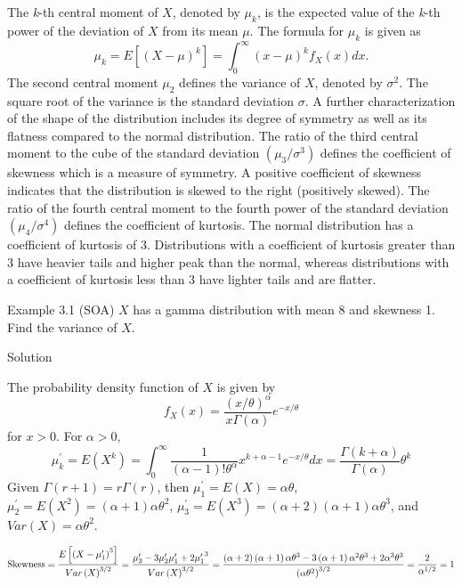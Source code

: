 \documentclass[]{book}
\theoremstyle{definition}
\theoremstyle{definition}
\theoremstyle{definition}
\theoremstyle{remark}
\begin{document}
The \emph{k}-th central moment of \(X\), denoted by \(\mu_{k}\), is the
expected value of the \emph{k}-th power of the deviation of \(X\) from
its mean \(\mu\). The formula for \(\mu_{k}\) is given as
\[\mu_{k} = E\left\lbrack {(X - \mu)}^{k} \right\rbrack = \int_{0}^{\infty}{\left( x - \mu \right)^{k}f_{X}\left( x \right) dx }.\]
The second central moment \(\mu_{2}\) defines the variance of \(X\),
denoted by \(\sigma^{2}\). The square root of the variance is the
standard deviation \(\sigma\). A further characterization of the shape
of the distribution includes its degree of symmetry as well as its
flatness compared to the normal distribution. The ratio of the third
central moment to the cube of the standard deviation
\(\left( \mu_{3} / \sigma^{3} \right)\) defines the coefficient of
skewness which is a measure of symmetry. A positive coefficient of
skewness indicates that the distribution is skewed to the right
(positively skewed). The ratio of the fourth central moment to the
fourth power of the standard deviation
\(\left(\mu_{4} / \sigma^{4} \right)\) defines the coefficient of
kurtosis. The normal distribution has a coefficient of kurtosis of 3.
Distributions with a coefficient of kurtosis greater than 3 have heavier
tails and higher peak than the normal, whereas distributions with a
coefficient of kurtosis less than 3 have lighter tails and are flatter.

Example 3.1 (SOA) \(X\) has a gamma distribution with mean 8 and
skewness 1. Find the variance of \(X\).

Solution

The probability density function of \(X\) is given by
\[f_{X}\left( x \right) = \frac{\left( x / \theta \right)^{\alpha}}{x\Gamma\left( \alpha \right)} e^{- x / \theta} \]
for \(x > 0\). For \(\alpha>0\),
\[\mu_{k}^{\prime} = E\left( X^{k} \right) = \int_{0}^{\infty}{\frac{1}{\left( \alpha - 1 \right)!\theta^{\alpha}}x^{k + \alpha - 1}e^{- x / \theta} dx} = \frac{\Gamma\left( k + \alpha \right)}{\Gamma\left( \alpha \right)}\theta^{k}\]
Given \(\Gamma\left( r + 1 \right) = r\Gamma\left( r \right)\), then
\(\mu_{1}^{\prime} = E\left( X \right) = \alpha\theta\),
\(\mu_{2}^{\prime} = E\left( X^{2} \right) = \left( \alpha + 1 \right)\alpha\theta^{2}\),
\(\mu_{3}^{\prime} = E\left( X^{3} \right) = \left( \alpha + 2 \right)\left( \alpha + 1 \right)\alpha\theta^{3}\),
and \(Var\left( X \right) = \alpha\theta^{2}\).

\[\text{Skewness}  = \frac{E\left\lbrack {(X - \mu_{1}^{\prime})}^{3} \right\rbrack}{{Var\left( X \right)}^{3/2}} = \frac{\mu_{3}^{\prime} - 3\mu_{2}^{\prime}\mu_{1}^{\prime} + 2{\mu_{1}^{\prime}}^{3}}{{Var\left( X \right)}^{3/2}} \\
 = \frac{\left( \alpha + 2 \right)\left( \alpha + 1 \right)\alpha\theta^{3} - 3\left( \alpha + 1 \right)\alpha^{2}\theta^{3} + 2\alpha^{3}\theta^{3}}{\left( \alpha\theta^{2} \right)^{3/2}} = \frac{2}{\alpha^{1/2}} = 1\]
\end{document}
